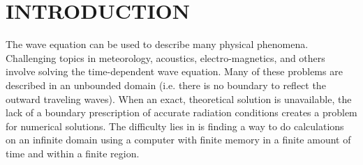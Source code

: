 \chapter{INTRODUCTION} \label{ch:intro}

The wave equation can be used to describe many physical phenomena.
Challenging topics in meteorology, acoustics, electro-magnetics, and
others involve solving the time-dependent wave equation.  Many of
these problems are described in an unbounded domain (i.e. there is no
boundary to reflect the outward traveling waves).  When an exact,
theoretical solution is unavailable, the lack of a boundary
prescription of accurate radiation conditions creates a problem for
numerical solutions.  The difficulty lies in is finding a way to do
calculations on an infinite domain using a computer with finite memory
in a finite amount of time and within a finite region.